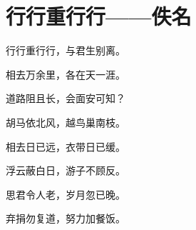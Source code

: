 \section{行行重行行——佚名}

行行重行行，与君生别离。

相去万余里，各在天一涯。

道路阻且长，会面安可知？

胡马依北风，越鸟巢南枝。

相去日已远，衣带日已缓。

浮云蔽白日，游子不顾反。

思君令人老，岁月忽已晚。

弃捐勿复道，努力加餐饭。